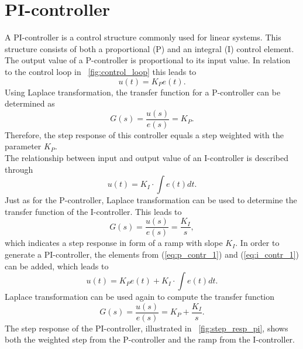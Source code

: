 \section{PI-controller}
A PI-controller is a control structure commonly used for linear systems. This structure consists of both a proportional (P) and an integral (I) control element.
The output value of a P-controller is proportional to its input value. In relation to the control loop in \figurename~\ref{fig:control_loop} this leads to
\begin{equation}
    u(t) = K_{P}e(t).
 \label{eq:p_contr_1}
\end{equation}
Using Laplace transformation, the transfer function for a P-controller can be determined as
\begin{equation}
    G(s) = \frac{u(s)}{e(s)} = K_{P}.
 \label{eq:p_contr_2}
\end{equation}
Therefore, the step response of this controller equals a step weighted with the parameter $K_{P}$.
\\The relationship between input and output value of an I-controller is described through
\begin{equation}
    u(t) = K_{I}\cdot\int e(t) dt.
 \label{eq:i_contr_1}
\end{equation}
Just as for the P-controller, Laplace transformation can be used to determine the transfer function of the I-controller.
This leads to
\begin{equation}
    G(s) = \frac{u(s)}{e(s)} = \frac{K_{I}}{s},
 \label{eq:i_contr_2}
\end{equation}
which indicates a step response in form of a ramp with slope $K_{I}$.
In order to generate a PI-controller, the elements from (\ref{eq:p_contr_1}) and (\ref{eq:i_contr_1}) can be added, which leads to
\begin{equation}
    u(t) = K_{P}e(t) + K_{I}\cdot\int e(t) dt.
 \label{eq:pi_contr_1}
\end{equation}
Laplace transformation can be used again to compute the transfer function
\begin{equation}
    G(s) = \frac{u(s)}{e(s)} =  K_{P} + \frac{K_{I}}{s}.
 \label{eq:pi_contr_2}
\end{equation}
The step response of the PI-controller, illustrated in \figurename~\ref{fig:step_resp_pi}, shows both the weighted step from the P-controller and the ramp from the I-controller.

